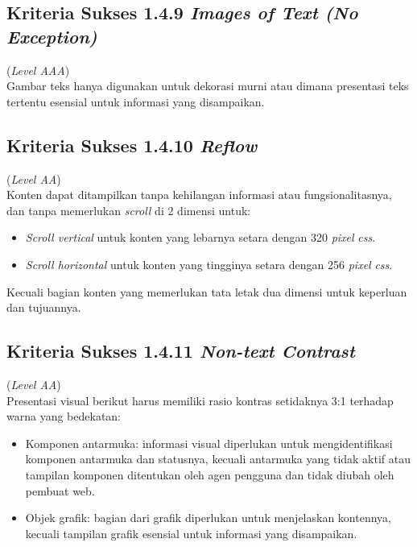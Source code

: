 \subsection{Kriteria Sukses 1.4.9 \textit{Images of Text (No Exception)}}
\label{subsec:kriteria_1.4.9}
(\textit{Level AAA}) \\

Gambar teks hanya digunakan untuk dekorasi murni atau dimana presentasi teks tertentu esensial untuk informasi yang disampaikan. 

\subsection{Kriteria Sukses 1.4.10 \textit{Reflow}}
\label{subsec:kriteria_1.4.10}
(\textit{Level AA}) \\

Konten dapat ditampilkan tanpa kehilangan informasi atau fungsionalitasnya, dan tanpa memerlukan \textit{scroll} di 2 dimensi untuk:

\begin{itemize}
	\item \textit{Scroll vertical} untuk konten yang lebarnya setara dengan 320 \textit{pixel} \textit{css}.
	\item \textit{Scroll horizontal} untuk konten yang tingginya setara dengan 256 \textit{pixel} \textit{css}.
\end{itemize}

Kecuali bagian konten yang memerlukan tata letak dua dimensi untuk keperluan dan tujuannya.

\subsection{Kriteria Sukses 1.4.11 \textit{Non-text Contrast}}
\label{subsec:kriteria_1.4.11}
(\textit{Level AA}) \\

Presentasi visual berikut harus memiliki rasio kontras setidaknya 3:1 terhadap warna yang bedekatan:

\begin{itemize}
	\item Komponen antarmuka: informasi visual diperlukan untuk mengidentifikasi komponen antarmuka dan statusnya, kecuali antarmuka yang tidak aktif atau tampilan komponen ditentukan oleh agen pengguna dan tidak diubah oleh pembuat web.
	\item Objek grafik: bagian dari grafik diperlukan untuk menjelaskan kontennya, kecuali tampilan grafik esensial untuk informasi yang disampaikan.
\end{itemize}

